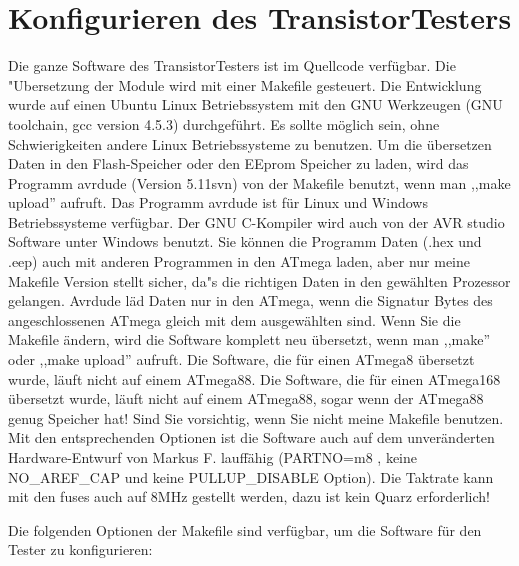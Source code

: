 \chapter{Konfigurieren des TransistorTesters}
\label{sec:config}
Die ganze Software des TransistorTesters ist im Quellcode verf\"ugbar.
Die "Ubersetzung der Module wird mit einer Makefile gesteuert. Die Entwicklung wurde
auf einen Ubuntu Linux Betriebssystem mit den GNU Werkzeugen (GNU toolchain, gcc version 4.5.3) durchgef\"uhrt.
Es sollte m\"oglich sein, ohne Schwierigkeiten andere Linux Betriebssysteme zu benutzen.
Um die \"ubersetzen Daten in den Flash-Speicher oder den EEprom Speicher zu laden, wird das
Programm avrdude (Version 5.11svn) von der Makefile benutzt, wenn man ,,make upload'' aufruft.
Das Programm avrdude ist f\"ur Linux und Windows Betriebssysteme verf\"ugbar.
Der GNU C-Kompiler wird auch von der AVR studio Software unter Windows benutzt.
Sie k\"onnen die Programm Daten (.hex und .eep) auch mit anderen Programmen in den ATmega laden,
aber nur meine Makefile Version stellt sicher, da"s die richtigen Daten in den gew\"ahlten Prozessor gelangen.
Avrdude l\"ad Daten nur in den ATmega, wenn die Signatur Bytes des angeschlossenen ATmega gleich mit dem ausgew\"ahlten sind.
Wenn Sie die Makefile \"andern, wird die Software komplett neu \"ubersetzt, wenn man ,,make'' oder
,,make upload'' aufruft.
Die Software, die f\"ur einen ATmega8 \"ubersetzt wurde, l\"auft nicht auf einem ATmega88.
Die Software, die f\"ur einen ATmega168 \"ubersetzt wurde, l\"auft nicht auf einem ATmega88, sogar wenn
der ATmega88 genug Speicher hat!
Sind Sie vorsichtig, wenn Sie nicht meine Makefile benutzen.
Mit den entsprechenden Optionen ist die Software auch auf dem unver\"anderten Hardware-Entwurf von
Markus F. lauff\"ahig (PARTNO=m8 , keine NO\_AREF\_CAP und keine PULLUP\_DISABLE Option).
Die Taktrate kann mit den fuses auch auf 8MHz gestellt werden, dazu ist kein Quarz erforderlich!


Die folgenden Optionen der Makefile sind verf\"ugbar, um die Software f\"ur den Tester zu konfigurieren:

